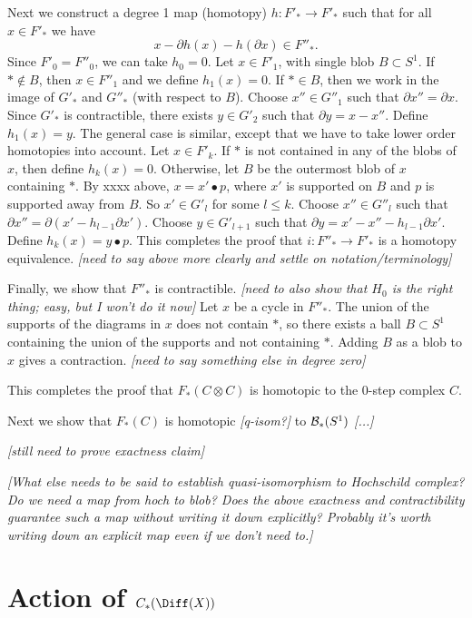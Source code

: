 \documentclass[11pt,leqno]{article}
\def\bc{{\cal B}}
\def\bd{\partial}
\def\sub{\subset}
\def\nn#1{{{\it \small [#1]}}}
\newcommand{\eq}[1]{\begin{displaymath}#1\end{displaymath}}
\begin{document}
Next we construct a degree 1 map (homotopy) $h: F'_* \to F'_*$ such that
for all $x \in F'_*$ we have
\eq{
	x - \bd h(x) - h(\bd x) \in F''_* .
}
Since $F'_0 = F''_0$, we can take $h_0 = 0$.
Let $x \in F'_1$, with single blob $B \sub S^1$.
If $* \notin B$, then $x \in F''_1$ and we define $h_1(x) = 0$.
If $* \in B$, then we work in the image of $G'_*$ and $G''_*$ (with respect to $B$).
Choose $x'' \in G''_1$ such that $\bd x'' = \bd x$.
Since $G'_*$ is contractible, there exists $y \in G'_2$ such that $\bd y = x - x''$.
Define $h_1(x) = y$.
The general case is similar, except that we have to take lower order homotopies into account.
Let $x \in F'_k$.
If $*$ is not contained in any of the blobs of $x$, then define $h_k(x) = 0$.
Otherwise, let $B$ be the outermost blob of $x$ containing $*$.
By xxxx above, $x = x' \bullet p$, where $x'$ is supported on $B$ and $p$ is supported away from $B$.
So $x' \in G'_l$ for some $l \le k$.
Choose $x'' \in G''_l$ such that $\bd x'' = \bd (x' - h_{l-1}\bd x')$.
Choose $y \in G'_{l+1}$ such that $\bd y = x' - x'' - h_{l-1}\bd x'$.
Define $h_k(x) = y \bullet p$.
This completes the proof that $i: F''_* \to F'_*$ is a homotopy equivalence.
\nn{need to say above more clearly and settle on notation/terminology}

Finally, we show that $F''_*$ is contractible.
\nn{need to also show that $H_0$ is the right thing; easy, but I won't do it now}
Let $x$ be a cycle in $F''_*$.
The union of the supports of the diagrams in $x$ does not contain $*$, so there exists a 
ball $B \subset S^1$ containing the union of the supports and not containing $*$.
Adding $B$ as a blob to $x$ gives a contraction.
\nn{need to say something else in degree zero}

This completes the proof that $F_*(C\otimes C)$ is
homotopic to the 0-step complex $C$.

\medskip

Next we show that $F_*(C)$ is homotopic \nn{q-isom?} to $\bc_*(S^1)$
\nn{...}

\bigskip

\nn{still need to prove exactness claim}

\nn{What else needs to be said to establish quasi-isomorphism to Hochschild complex?
Do we need a map from hoch to blob?
Does the above exactness and contractibility guarantee such a map without writing it
down explicitly?
Probably it's worth writing down an explicit map even if we don't need to.}



\section{Action of $C_*(\Diff(X))$}  \label{diffsect}
\end{document}
